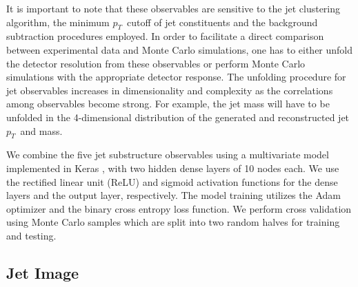 \documentclass[notoc]{JHEP3}
\newcommand{\pt}{$p_{T}$}
\newcommand{\jw}{\textsc{Jewel}~}
\begin{document}
It is important to note that these observables are sensitive to the jet clustering algorithm, the minimum \pt ~cutoff of jet constituents and the background subtraction procedures employed. In order to facilitate a direct comparison between experimental data and Monte Carlo simulations, one has to either unfold the detector resolution from these observables or perform Monte Carlo simulations with the appropriate detector response. The unfolding procedure for jet observables increases in dimensionality and complexity as the correlations among observables become strong. For example, the jet mass will have to be unfolded in the 4-dimensional distribution of the generated and reconstructed jet \pt ~and mass.

We combine the five jet substructure observables using a multivariate model implemented in Keras \cite{keras}, with two hidden dense layers of 10 nodes each. We use the rectified linear unit (ReLU) \cite{nair2010rectified} and sigmoid activation functions for the dense layers and the output layer, respectively. The model training utilizes the Adam optimizer \cite{adam} and the binary cross entropy loss function. We perform cross validation using Monte Carlo samples which are split into two random halves for training and testing.


\subsection{Jet Image}
\label{sec:image}
\end{document}
